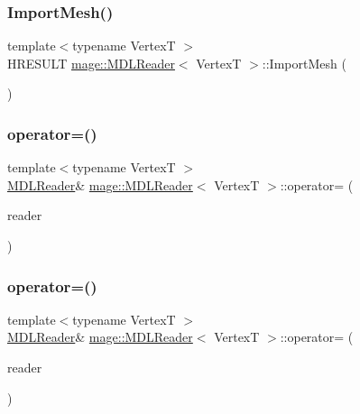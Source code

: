\subsubsection{\texorpdfstring{Import\+Mesh()}{ImportMesh()}}
{\footnotesize\ttfamily template$<$typename VertexT $>$ \\
H\+R\+E\+S\+U\+LT \hyperlink{classmage_1_1_m_d_l_reader}{mage\+::\+M\+D\+L\+Reader}$<$ VertexT $>$\+::Import\+Mesh (\begin{DoxyParamCaption}{ }\end{DoxyParamCaption})\hspace{0.3cm}{\ttfamily [private]}}

\hypertarget{classmage_1_1_m_d_l_reader_a8cc5e9966283f3f9727fa28a75412ddb}{}\label{classmage_1_1_m_d_l_reader_a8cc5e9966283f3f9727fa28a75412ddb} 
\subsubsection{\texorpdfstring{operator=()}{operator=()}\hspace{0.1cm}{\footnotesize\ttfamily [1/2]}}
{\footnotesize\ttfamily template$<$typename VertexT $>$ \\
\hyperlink{classmage_1_1_m_d_l_reader}{M\+D\+L\+Reader}\& \hyperlink{classmage_1_1_m_d_l_reader}{mage\+::\+M\+D\+L\+Reader}$<$ VertexT $>$\+::operator= (\begin{DoxyParamCaption}\item[{const \hyperlink{classmage_1_1_m_d_l_reader}{M\+D\+L\+Reader}$<$ VertexT $>$ \&}]{reader }\end{DoxyParamCaption})\hspace{0.3cm}{\ttfamily [delete]}}

\hypertarget{classmage_1_1_m_d_l_reader_a993c23d2e7f16f22a28e48ae9b7173b4}{}\label{classmage_1_1_m_d_l_reader_a993c23d2e7f16f22a28e48ae9b7173b4} 
\subsubsection{\texorpdfstring{operator=()}{operator=()}\hspace{0.1cm}{\footnotesize\ttfamily [2/2]}}
{\footnotesize\ttfamily template$<$typename VertexT $>$ \\
\hyperlink{classmage_1_1_m_d_l_reader}{M\+D\+L\+Reader}\& \hyperlink{classmage_1_1_m_d_l_reader}{mage\+::\+M\+D\+L\+Reader}$<$ VertexT $>$\+::operator= (\begin{DoxyParamCaption}\item[{\hyperlink{classmage_1_1_m_d_l_reader}{M\+D\+L\+Reader}$<$ VertexT $>$ \&\&}]{reader }\end{DoxyParamCaption})\hspace{0.3cm}{\ttfamily [delete]}}

